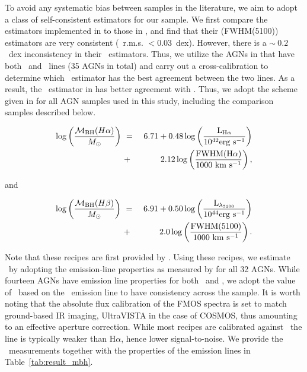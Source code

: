 \documentclass[apj]{emulateapj}
\begin{document}


To avoid any systematic bias between samples in the literature, we aim to adopt a class of self-consistent estimators for our sample. We first compare the estimators implemented in \citet{Schulze2018} to those in \citet{Ding2017b}, and find that their \hbeta(FWHM(5100)) estimators are very consistent (\mbh\ r.m.s. $<0.03$~dex). However, there is a $\sim~0.2$~dex inconsistency in their \halpha\ estimators. Thus, we utilize the AGNs in \citet{Schulze2018} that have both \halpha\ and \hbeta\ lines (35 AGNs in total) and carry out a cross-calibration to determine which \halpha\ estimator has the best agreement between the two lines. As a  result, the \halpha\ estimator in \citet{Schulze2018} has better agreement with \hbeta. Thus, we adopt the scheme given in \citet{Schulze2018} for all AGN samples used in this study, including the comparison samples described below.

\begin{eqnarray}
\label{eq:Ha}
\log \left(\frac{\mathcal M_{\rm BH} (H\alpha)}{M_{\odot}}\right)&~=~& 6.71+0.48 \log \left(\frac{ \rm L _{H\alpha}}{10^{42}{\rm erg~s^{-1}}}\right) \nonumber\\
&~+~& 2.12 \log \left(\frac{\rm FWHM(H\alpha)}{1000 ~{\rm km~s^{-1}}}\right) ,
\end {eqnarray}

and

\begin{eqnarray}
\label{eq:Hb}
\log \left(\frac{\mathcal M_{\rm BH}(H\beta) }{M_{\odot}}\right)&~=~& 6.91+0.50\log \left(\frac{ \rm L _{\lambda_{5100}}}{10^{44}{\rm erg~s^{-1}}}\right) \nonumber\\
&~+~& 2.0 \log \left(\frac{\rm FWHM(5100)}{1000 ~{\rm km~s^{-1}}}\right) .
\end {eqnarray}

Note that these recipes are first provided by \citet{Vestergaard2006}. Using these recipes, we estimate \mbh\ by adopting the emission-line properties as measured by \citet{Schulze2018} for all 32 AGNs. While fourteen AGNs have emission line properties for both \halpha\ and \hbeta, we adopt the value of \mbh\ based on the \halpha\ emission line to have consistency across the sample. It is worth noting that the absolute flux calibration of the FMOS spectra is set to match ground-based IR imaging, UltraVISTA in the case of COSMOS, thus amounting to an effective aperture correction. While most recipes are calibrated against \hbeta\, the line is typically weaker than H$\alpha$, hence lower signal-to-noise. We provide the \mbh\ measurements together with the properties of the emission lines in Table~\ref{tab:result_mbh}. 
\end{document}

